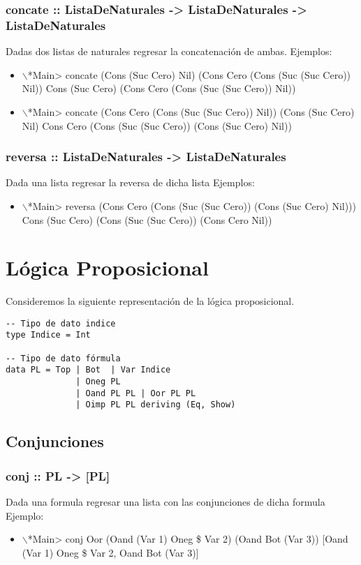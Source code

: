 \documentclass[11pt]{article}
\begin{document}
\subsubsection{concate :: ListaDeNaturales -> ListaDeNaturales -> ListaDeNaturales}
\label{sec:org31a6a3d}
Dadas dos listas de naturales regresar la concatenación de ambas.
Ejemplos:
\begin{itemize}
\item $\backslash$*Main> concate (Cons (Suc Cero) Nil) (Cons Cero (Cons (Suc (Suc Cero)) Nil))
Cons (Suc Cero) (Cons Cero (Cons (Suc (Suc Cero)) Nil))
\item $\backslash$*Main> concate (Cons Cero (Cons (Suc (Suc Cero)) Nil)) (Cons (Suc Cero) Nil)
Cons Cero (Cons (Suc (Suc Cero)) (Cons (Suc Cero) Nil))
\end{itemize}
\subsubsection{reversa :: ListaDeNaturales -> ListaDeNaturales}
\label{sec:orga8ef633}
Dada una lista regresar la reversa de dicha lista
Ejemplos:
\begin{itemize}
\item $\backslash$*Main> reversa (Cons Cero (Cons (Suc (Suc Cero)) (Cons (Suc Cero) Nil))) 
Cons (Suc Cero) (Cons (Suc (Suc Cero)) (Cons Cero Nil))
\end{itemize}

\section{Lógica Proposicional}
\label{sec:org5aaca62}
Consideremos la siguiente representación de la lógica proposicional.
\begin{verbatim}
-- Tipo de dato indice
type Indice = Int

-- Tipo de dato fórmula
data PL = Top | Bot  | Var Indice
              | Oneg PL 
              | Oand PL PL | Oor PL PL 
              | Oimp PL PL deriving (Eq, Show)
\end{verbatim}
\subsection{Conjunciones}
\label{sec:org444082f}
\subsubsection{conj :: PL -> [PL]}
\label{sec:org8f7788e}
Dada una formula regresar una lista con las conjunciones de dicha formula
Ejemplo: 
\begin{itemize}
\item $\backslash$*Main> conj Oor (Oand (Var 1) Oneg \$ Var 2) (Oand Bot (Var 3))
[Oand (Var 1) Oneg \$ Var 2, Oand Bot (Var 3)]
\end{itemize}
\end{document}
